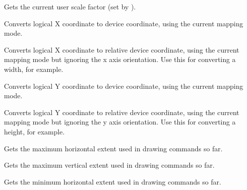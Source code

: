 
Gets the current user scale factor (set by ).

\label{wxdclogicaltodevicex}


Converts logical X coordinate to device coordinate, using the current
mapping mode.

\label{wxdclogicaltodevicexrel}


Converts logical X coordinate to relative device coordinate, using the current
mapping mode but ignoring the x axis orientation.
Use this for converting a width, for example.

\label{wxdclogicaltodevicey}


Converts logical Y coordinate to device coordinate, using the current
mapping mode.

\label{wxdclogicaltodeviceyrel}


Converts logical Y coordinate to relative device coordinate, using the current
mapping mode but ignoring the y axis orientation.
Use this for converting a height, for example.

\label{wxdcmaxx}


Gets the maximum horizontal extent used in drawing commands so far.

\label{wxdcmaxy}


Gets the maximum vertical extent used in drawing commands so far.

\label{wxdcminx}


Gets the minimum horizontal extent used in drawing commands so far.

\label{wxdcminy}

